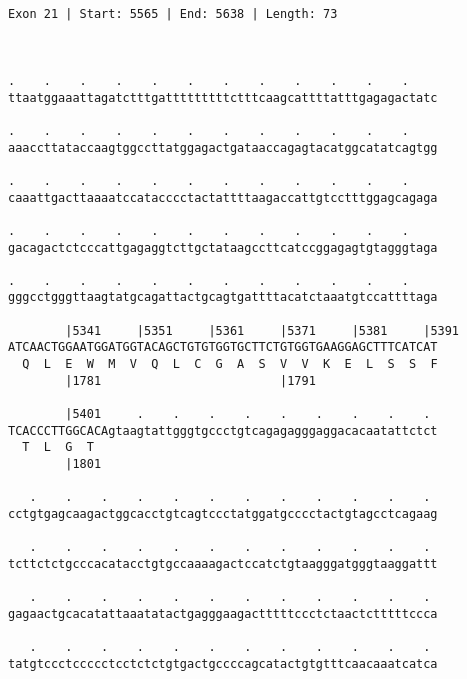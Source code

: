 \documentclass{article}
\begin{document}
\begin{Verbatim}
                                                       
 
Exon 21 | Start: 5565 | End: 5638 | Length: 73



.    .    .    .    .    .    .    .    .    .    .    .    
ttaatggaaattagatctttgatttttttttctttcaagcattttatttgagagactatc
                                                            
.    .    .    .    .    .    .    .    .    .    .    .    
aaaccttataccaagtggccttatggagactgataaccagagtacatggcatatcagtgg
                                                            
.    .    .    .    .    .    .    .    .    .    .    .    
caaattgacttaaaatccatacccctactattttaagaccattgtcctttggagcagaga
                                                            
.    .    .    .    .    .    .    .    .    .    .    .    
gacagactctcccattgagaggtcttgctataagccttcatccggagagtgtagggtaga
                                                            
.    .    .    .    .    .    .    .    .    .    .    .    
gggcctgggttaagtatgcagattactgcagtgattttacatctaaatgtccattttaga
                                                            
        |5341     |5351     |5361     |5371     |5381     |5391
ATCAACTGGAATGGATGGTACAGCTGTGTGGTGCTTCTGTGGTGAAGGAGCTTTCATCAT
  Q  L  E  W  M  V  Q  L  C  G  A  S  V  V  K  E  L  S  S  F
        |1781                         |1791                 
  
        |5401     .    .    .    .    .    .    .    .    . 
TCACCCTTGGCACAgtaagtattgggtgccctgtcagagagggaggacacaatattctct
  T  L  G  T                                                
        |1801                                               
  
   .    .    .    .    .    .    .    .    .    .    .    . 
cctgtgagcaagactggcacctgtcagtccctatggatgcccctactgtagcctcagaag
                                                            
   .    .    .    .    .    .    .    .    .    .    .    . 
tcttctctgcccacatacctgtgccaaaagactccatctgtaagggatgggtaaggattt
                                                            
   .    .    .    .    .    .    .    .    .    .    .    . 
gagaactgcacatattaaatatactgagggaagactttttccctctaactctttttccca
                                                            
   .    .    .    .    .    .    .    .    .    .    .    . 
tatgtccctccccctcctctctgtgactgccccagcatactgtgtttcaacaaatcatca
                                                            

\end{Verbatim}
\end{document}
